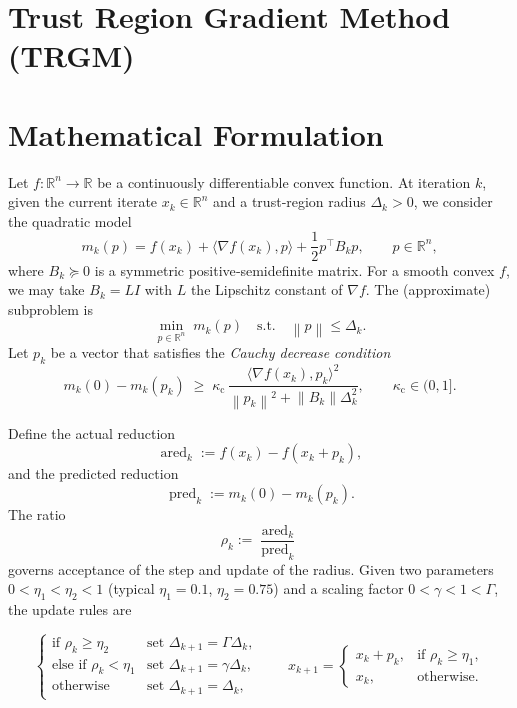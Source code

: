 \documentclass{article}
\newcommand{\norm}[1]{\left\lVert#1\right\rVert}
\newcommand{\inner}[2]{\langle #1,#2\rangle}
\begin{document}
\section*{Trust Region Gradient Method (TRGM)}

\section*{Mathematical Formulation}
Let $f:\mathbb{R}^{n}\rightarrow\mathbb{R}$ be a continuously differentiable convex function.
At iteration $k$, given the current iterate $x_k\in\mathbb{R}^{n}$ and a trust‑region radius
$\Delta_k>0$, we consider the quadratic model
\[
m_k(p)=f(x_k)+\inner{\nabla f(x_k)}{p}+\frac{1}{2}p^{\top}B_kp,
\qquad p\in\mathbb{R}^{n},
\]
where $B_k\succeq 0$ is a symmetric positive‑semidefinite matrix.
For a smooth convex $f$, we may take $B_k=L I$ with $L$ the Lipschitz constant of $\nabla f$.
The (approximate) subproblem is
\[
\min_{p\in\mathbb{R}^{n}}\; m_k(p)\quad\text{s.t.}\quad \norm{p}\le \Delta_k .
\tag{1}
\]
Let $p_k$ be a vector that satisfies the \emph{Cauchy decrease condition}
\[
m_k(0)-m_k(p_k)\;\ge\;\kappa_{\mathrm{c}}\,
\frac{\inner{\nabla f(x_k)}{p_k}^{2}}{\norm{p_k}^{2}+ \norm{B_k}\Delta_k^{2}},
\qquad\kappa_{\mathrm{c}}\in(0,1].
\tag{2}
\]

Define the actual reduction
\[
\operatorname{ared}_k:=f(x_k)-f(x_k+p_k),
\]
and the predicted reduction
\[
\operatorname{pred}_k:=m_k(0)-m_k(p_k).
\]
The ratio
\[
\rho_k:=\frac{\operatorname{ared}_k}{\operatorname{pred}_k}
\tag{3}
\]
governs acceptance of the step and update of the radius.  
Given two parameters $0<\eta_{1}<\eta_{2}<1$ (typical $\eta_{1}=0.1$, $\eta_{2}=0.75$) and a scaling factor $0<\gamma<1<\Gamma$, the update rules are

\[
\begin{cases}
\text{if }\rho_k\ge \eta_{2} &\text{set } \Delta_{k+1}= \Gamma\Delta_k,\\[4pt]
\text{else if }\rho_k<\eta_{1}&\text{set } \Delta_{k+1}= \gamma\Delta_k,\\[4pt]
\text{otherwise} &\text{set } \Delta_{k+1}= \Delta_k,
\end{cases}
\qquad
x_{k+1}= 
\begin{cases}
x_k+p_k, &\text{if }\rho_k\ge \eta_{1},\\
x_k, &\text{otherwise.}
\end{cases}
\tag{4}
\]
\end{document}
